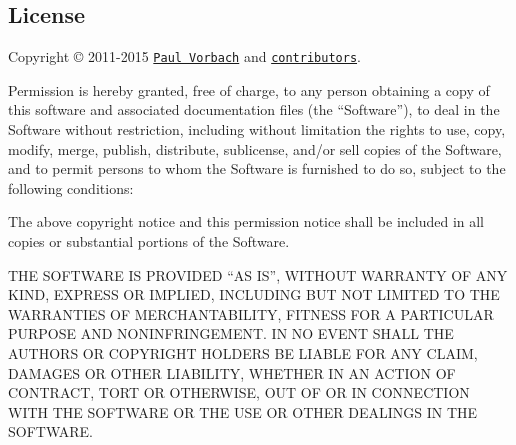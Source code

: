 \subsection*{License}

Copyright © 2011-\/2015 \href{http://paul.vorba.ch/}{\tt Paul Vorbach} and \href{https://github.com/pvorb/node-clone/graphs/contributors}{\tt contributors}.

Permission is hereby granted, free of charge, to any person obtaining a copy of this software and associated documentation files (the “\+Software”), to deal in the Software without restriction, including without limitation the rights to use, copy, modify, merge, publish, distribute, sublicense, and/or sell copies of the Software, and to permit persons to whom the Software is furnished to do so, subject to the following conditions\+:

The above copyright notice and this permission notice shall be included in all copies or substantial portions of the Software.

T\+HE S\+O\+F\+T\+W\+A\+RE IS P\+R\+O\+V\+I\+D\+ED “\+AS I\+S”, W\+I\+T\+H\+O\+UT W\+A\+R\+R\+A\+N\+TY OF A\+NY K\+I\+ND, E\+X\+P\+R\+E\+SS OR I\+M\+P\+L\+I\+ED, I\+N\+C\+L\+U\+D\+I\+NG B\+UT N\+OT L\+I\+M\+I\+T\+ED TO T\+HE W\+A\+R\+R\+A\+N\+T\+I\+ES OF M\+E\+R\+C\+H\+A\+N\+T\+A\+B\+I\+L\+I\+TY, F\+I\+T\+N\+E\+SS F\+OR A P\+A\+R\+T\+I\+C\+U\+L\+AR P\+U\+R\+P\+O\+SE A\+ND N\+O\+N\+I\+N\+F\+R\+I\+N\+G\+E\+M\+E\+NT. IN NO E\+V\+E\+NT S\+H\+A\+LL T\+HE A\+U\+T\+H\+O\+RS OR C\+O\+P\+Y\+R\+I\+G\+HT H\+O\+L\+D\+E\+RS BE L\+I\+A\+B\+LE F\+OR A\+NY C\+L\+A\+IM, D\+A\+M\+A\+G\+ES OR O\+T\+H\+ER L\+I\+A\+B\+I\+L\+I\+TY, W\+H\+E\+T\+H\+ER IN AN A\+C\+T\+I\+ON OF C\+O\+N\+T\+R\+A\+CT, T\+O\+RT OR O\+T\+H\+E\+R\+W\+I\+SE, O\+UT OF OR IN C\+O\+N\+N\+E\+C\+T\+I\+ON W\+I\+TH T\+HE S\+O\+F\+T\+W\+A\+RE OR T\+HE U\+SE OR O\+T\+H\+ER D\+E\+A\+L\+I\+N\+GS IN T\+HE S\+O\+F\+T\+W\+A\+RE. 